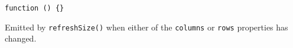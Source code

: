 \texttt{function\ ()\ \{\}}

Emitted by \texttt{refreshSize()} when either of the \texttt{columns} or
\texttt{rows} properties has changed.

\begin{Shaded}
\begin{Highlighting}[]
\NormalTok{(}\NormalTok{, }\NormalTok{() \{}
  \NormalTok{(}\NormalTok{);}
  \NormalTok{(} \NormalTok{+ } \NormalTok{+ }\NormalTok{);}
\NormalTok{\});}
\end{Highlighting}
\end{Shaded}

